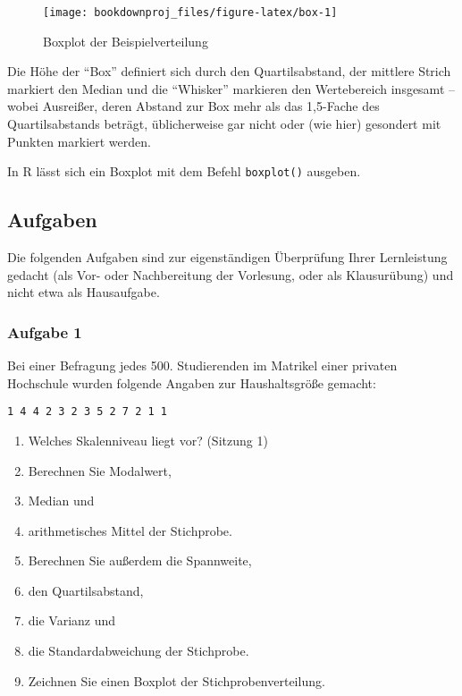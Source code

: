\documentclass[
  ngerman,
]{article}
\providecommand{\tightlist}{%
  \setlength{\itemsep}{0pt}\setlength{\parskip}{0pt}}
\begin{document}
\begin{figure}[h]

{\centering \texttt{[image: bookdownproj\_files/figure-latex/box-1]} 

}

\caption{Boxplot der Beispielverteilung}\label{fig:box}
\end{figure}

Die Höhe der ``Box'' definiert sich durch den Quartilsabstand, der mittlere Strich markiert den Median und die ``Whisker'' markieren den Wertebereich insgesamt -- wobei Ausreißer, deren Abstand zur Box mehr als das 1,5-Fache des Quartilsabstands beträgt, üblicherweise gar nicht oder (wie hier) gesondert mit Punkten markiert werden.

\begin{rtip}
In R lässt sich ein Boxplot mit dem Befehl {\tt boxplot()} ausgeben.
\end{rtip}

\hypertarget{aufgaben-1}{%
\subsection{Aufgaben}\label{aufgaben-1}}

Die folgenden Aufgaben sind zur eigenständigen Überprüfung Ihrer Lernleistung gedacht (als Vor- oder Nachbereitung der Vorlesung, oder als Klausurübung) und nicht etwa als Hausaufgabe.

\hypertarget{aufgabe-1-1}{%
\subsubsection{Aufgabe 1}\label{aufgabe-1-1}}

Bei einer Befragung jedes 500. Studierenden im Matrikel einer privaten Hochschule wurden folgende Angaben zur Haushaltsgröße gemacht:

\texttt{1\ 4\ 4\ 2\ 3\ 2\ 3\ 5\ 2\ 7\ 2\ 1\ 1}

\begin{enumerate}
\def\labelenumi{\alph{enumi})}
\tightlist
\item
  Welches Skalenniveau liegt vor? (Sitzung 1)
\item
  Berechnen Sie Modalwert,
\item
  Median und
\item
  arithmetisches Mittel der Stichprobe.
\item
  Berechnen Sie außerdem die Spannweite,
\item
  den Quartilsabstand,
\item
  die Varianz und
\item
  die Standardabweichung der Stichprobe.
\item
  Zeichnen Sie einen Boxplot der Stichprobenverteilung.
\end{enumerate}
\end{document}
